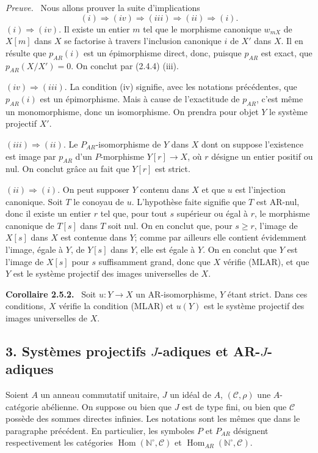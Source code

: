 \documentclass[11pt]{article}
\providecommand{\NN}{\mathbb{N}}
\newenvironment{statement}[1]{\par\medskip\noindent\textbf{#1.}\ }{\par\medskip}
\newenvironment{prooftext}[1][Proof]{\par\noindent\emph{#1.}\ }{\par\medskip}
\DeclareMathOperator{\Hom}{Hom}
\providecommand{\Hom}{\operatorname{Hom}}
\providecommand{\NN}{\mathbb N}
\providecommand{\cC}{\mathcal C}
\providecommand{\cC}{\mathcal C}
\begin{document}
\begin{prooftext}[Preuve]
Nous allons prouver la suite d'implications
\[
(i)\Rightarrow(iv)\Rightarrow(iii)\Rightarrow(ii)\Rightarrow(i).
\]
$(i)\Rightarrow(iv)$. Il existe un entier $m$ tel que le morphisme canonique $w_{mX}$ de $X[m]$ dans $X$ se factorise à travers l'inclusion canonique $i$ de $X'$ dans $X$. Il en résulte que $p_{AR}(i)$ est un épimorphisme direct, donc, puisque $p_{AR}$ est exact, que $p_{AR}(X/X')=0$. On conclut par (2.4.4) (iii).

$(iv)\Rightarrow(iii)$. La condition (iv) signifie, avec les notations précédentes, que $p_{AR}(i)$ est un épimorphisme. Mais à cause de l'exactitude de $p_{AR}$, c'est même un monomorphisme, donc un isomorphisme. On prendra pour objet $Y$ le système projectif $X'$.

$(iii)\Rightarrow(ii)$. Le $P_{AR}$-isomorphisme de $Y$ dans $X$ dont on suppose l'existence est image par $p_{AR}$ d'un $P$-morphisme $Y[r]\to X$, où $r$ désigne un entier positif ou nul. On conclut grâce au fait que $Y[r]$ est strict.

$(ii)\Rightarrow(i)$. On peut supposer $Y$ contenu dans $X$ et que $u$ est l'injection canonique. Soit $T$ le conoyau de $u$. L'hypothèse faite signifie que $T$ est AR-nul, donc il existe un entier $r$ tel que, pour tout $s$ supérieur ou égal à $r$, le morphisme canonique de $T[s]$ dans $T$ soit nul. On en conclut que, pour $s\ge r$, l'image de $X[s]$ dans $X$ est contenue dans $Y$; comme par ailleurs elle contient évidemment l'image, égale à $Y$, de $Y[s]$ dans $Y$, elle est égale à $Y$. On en conclut que $Y$ est l'image de $X[s]$ pour $s$ suffisamment grand, donc que $X$ vérifie (MLAR), et que $Y$ est le système projectif des images universelles de $X$.
\end{prooftext}

\begin{statement}{Corollaire 2.5.2}
Soit $u:Y\to X$ un AR-isomorphisme, $Y$ étant strict. Dans ces conditions, $X$ vérifie la condition (MLAR) et $u(Y)$ est le système projectif des images universelles de $X$.
\end{statement}

\subsection*{3. Systèmes projectifs $J$-adiques et AR-$J$-adiques}
Soient $A$ un anneau commutatif unitaire, $J$ un idéal de $A$, $(\cC,\rho)$ une $A$-catégorie abélienne. On suppose ou bien que $J$ est de type fini, ou bien que $\cC$ possède des sommes directes infinies. Les notations sont les mêmes que dans le paragraphe précédent. En particulier, les symboles $P$ et $P_{AR}$ désignent respectivement les catégories $\Hom(\NN^\circ,\cC)$ et $\Hom_{AR}(\NN^\circ,\cC)$.
\end{document}
